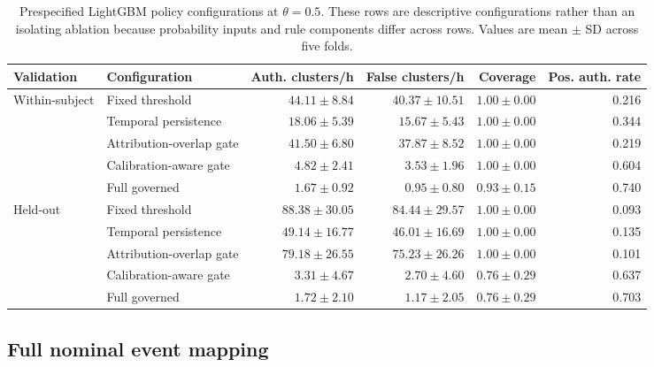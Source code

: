 \documentclass[11pt,a4paper]{article}
\begin{document}
\begin{table}[H]
\centering
\caption{Prespecified LightGBM policy configurations at $\theta=0.5$. These rows are descriptive configurations rather than an isolating ablation because probability inputs and rule components differ across rows. Values are mean $\pm$ SD across five folds.}
\label{tab:nominal_configs}
\scriptsize
\setlength{\tabcolsep}{4pt}
\begin{tabular}{llrrrr}
\toprule
Validation & Configuration & Auth. clusters/h & False clusters/h & Coverage & Pos. auth. rate \\
\midrule
\multirow{5}{*}{Within-subject}
& Fixed threshold & $44.11\pm8.84$ & $40.37\pm10.51$ & $1.00\pm0.00$ & 0.216 \\
& Temporal persistence & $18.06\pm5.39$ & $15.67\pm5.43$ & $1.00\pm0.00$ & 0.344 \\
& Attribution-overlap gate & $41.50\pm6.80$ & $37.87\pm8.52$ & $1.00\pm0.00$ & 0.219 \\
& Calibration-aware gate & $4.82\pm2.41$ & $3.53\pm1.96$ & $1.00\pm0.00$ & 0.604 \\
& Full governed & $1.67\pm0.92$ & $0.95\pm0.80$ & $0.93\pm0.15$ & 0.740 \\
\midrule
\multirow{5}{*}{Held-out}
& Fixed threshold & $88.38\pm30.05$ & $84.44\pm29.57$ & $1.00\pm0.00$ & 0.093 \\
& Temporal persistence & $49.14\pm16.77$ & $46.01\pm16.69$ & $1.00\pm0.00$ & 0.135 \\
& Attribution-overlap gate & $79.18\pm26.55$ & $75.23\pm26.26$ & $1.00\pm0.00$ & 0.101 \\
& Calibration-aware gate & $3.31\pm4.67$ & $2.70\pm4.60$ & $0.76\pm0.29$ & 0.637 \\
& Full governed & $1.72\pm2.10$ & $1.17\pm2.05$ & $0.76\pm0.29$ & 0.703 \\
\bottomrule
\end{tabular}
\end{table}
\FloatBarrier

\subsection{Full nominal event mapping}
\end{document}
